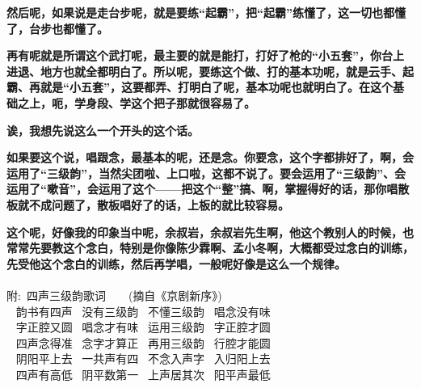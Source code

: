 \textbf{然后呢，如果说是走台步呢，就是要练``起霸''，把``起霸''练懂了，这一切也都懂了，台步也都懂了。}

\textbf{再有呢就是所谓这个武打呢，最主要的就是能打，打好了枪的``小五套''，你台上进退、地方也就全都明白了。所以呢，要练这个做、打的基本功呢，就是云手、起霸、再就是``小五套''，这要都弄、打明白了呢，基本功呢也就明白了。在这个基础之上，呃，学身段、学这个把子那就很容易了。}

\textbf{诶，我想先说这么一个开头的这个话。}

\textbf{如果要这个说，唱跟念，最基本的呢，还是念。你要念，这个字都排好了，啊，会运用了``三级韵''，当然尖团啦、上口啦，这都不说了。要会运用了``三级韵''、会运用了``嗽音''，会运用了这个------把这个``整''搞、啊，掌握得好的话，那你唱散板就不成问题了，散板唱好了的话，上板的就比较容易。}

\textbf{这个呢，好像我的印象当中呢，余叔岩，余叔岩先生啊，他这个教别人的时候，也常常先要教这个念白，特别是你像陈少霖啊、孟小冬啊，大概都受过念白的训练，先受他这个念白的训练，然后再学唱，一般呢好像是这么一个规律。}\\
\\
{\hei 附:~四声三级韵歌词~~~~(摘自《京剧新序》)}\\%
\hspace*{50pt}~ 韵书有四声~\hspace{40pt} 没有三级韵~\hspace{40pt} 不懂三级韵~\hspace{40pt} 唱念没有味\\ 
\hspace*{50pt}~ 字正腔又圆~\hspace{40pt} 唱念才有味~\hspace{40pt} 运用三级韵~\hspace{40pt} 字正腔才圆\\ 
\hspace*{50pt}~ 四声念得准~\hspace{40pt} 念字才算正~\hspace{40pt} 再用三级韵~\hspace{40pt} 行腔才能圆\\
\hspace*{50pt}~ 阴阳平上去~\hspace{40pt} 一共声有四~\hspace{40pt} 不念入声字~\hspace{40pt} 入归阳上去\\
\hspace*{50pt}~ 四声有高低~\hspace{40pt} 阴平数第一~\hspace{40pt} 上声居其次~\hspace{40pt} 阳平声最低\\
